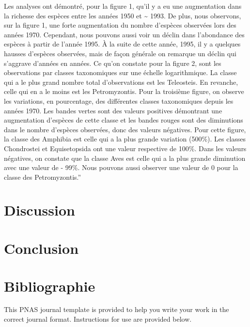 \documentclass[9pt,twocolumn,twoside,]{pnas-new}
\begin{document}
Les analyses ont démontré, pour la figure 1, qu'il y a eu une
augmentation dans la richesse des espèces entre les années 1950 et
\textasciitilde{} 1993. De plus, nous observons, sur la figure 1, une
forte augmentation du nombre d'espèces observées lors des années 1970.
Cependant, nous pouvons aussi voir un déclin dans l'abondance des
espèces à partir de l'année 1995. À la suite de cette année, 1995, il y
a quelques hausses d'espèces observées, mais de façon générale on
remarque un déclin qui s'aggrave d'années en années. Ce qu'on constate
pour la figure 2, sont les observations par classes taxonomiques sur une
échelle logarithmique. La classe qui a le plus grand nombre total
d'observations est les Teleosteis. En revanche, celle qui en a le moins
est les Petromyzontis. Pour la troisième figure, on observe les
variations, en pourcentage, des différentes classes taxonomiques depuis
les années 1970. Les bandes vertes sont des valeurs positives démontrant
une augmentation d'espèces de cette classe et les bandes rouges sont des
diminutions dans le nombre d'espèces observées, donc des valeurs
négatives. Pour cette figure, la classe des Amphibia est celle qui a la
plus grande variation (500\%). Les classes Chondrostei et Equisetopsida
ont une valeur respective de 100\%. Dans les valeurs négatives, on
constate que la classe Aves est celle qui a la plus grande diminution
avec une valeur de - 99\%. Nous pouvons aussi observer une valeur de 0
pour la classe des Petromyzontis.''

\section{Discussion}\label{discussion}

\section{Conclusion}\label{conclusion}

\section{Bibliographie}\label{bibliographie}

This PNAS journal template is provided to help you write your work in
the correct journal format. Instructions for use are provided below.



% 
\end{document}
